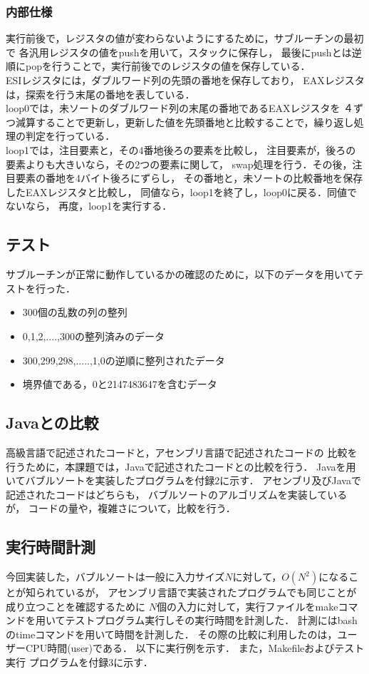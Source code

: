 \documentclass[a4j]{jarticle}
\begin{document}
\subsubsection{内部仕様}
実行前後で，レジスタの値が変わらないようにするために，サブルーチンの最初で
各汎用レジスタの値をpushを用いて，スタックに保存し，
最後にpushとは逆順にpopを行うことで，実行前後でのレジスタの値を保存している．\\
\indent ESIレジスタには，ダブルワード列の先頭の番地を保存しており，
EAXレジスタは，探索を行う末尾の番地を表している．\\
\indent loop0では，未ソートのダブルワード列の末尾の番地であるEAXレジスタを
４ずつ減算することで更新し，更新した値を先頭番地と比較することで，繰り返し処理の判定を行っている．\\
\indent loop1では，注目要素と，その4番地後ろの要素を比較し，
注目要素が，後ろの要素よりも大きいなら，その2つの要素に関して，
swap処理を行う．その後，注目要素の番地を4バイト後ろにずらし，
その番地と，未ソートの比較番地を保存したEAXレジスタと比較し，
同値なら，loop1を終了し，loop0に戻る．同値でないなら，
再度，loop1を実行する．

\subsection{テスト}
サブルーチンが正常に動作しているかの確認のために，以下のデータを用いてテストを行った．
\begin{itemize}
\item 300個の乱数の列の整列
\item 0,1,2,....,300の整列済みのデータ
\item 300,299,298,.....,1,0の逆順に整列されたデータ
\item 境界値である，0と2147483647を含むデータ
\end{itemize}

\subsection{Javaとの比較}
高級言語で記述されたコードと，アセンブリ言語で記述されたコードの
比較を行うために，本課題では，Javaで記述されたコードとの比較を行う．
Javaを用いてバブルソートを実装したプログラムを付録2に示す．
アセンブリ及びJavaで記述されたコードはどちらも，
バブルソートのアルゴリズムを実装しているが，
コードの量や，複雑さについて，比較を行う．

\subsection{実行時間計測}
今回実装した，バブルソートは一般に入力サイズ$N$に対して，$O(N^{2})$になることが知られているが，
アセンブリ言語で実装されたプログラムでも同じことが成り立つことを確認するために
$N$個の入力に対して，実行ファイルをmakeコマンドを用いてテストプログラム実行しその実行時間を計測した．
計測にはbashのtimeコマンドを用いて時間を計測した．
その際の比較に利用したのは，ユーザーCPU時間(user)である．
以下に実行例を示す．
また，Makefileおよびテスト実行 プログラムを付録3に示す．
\end{document}
